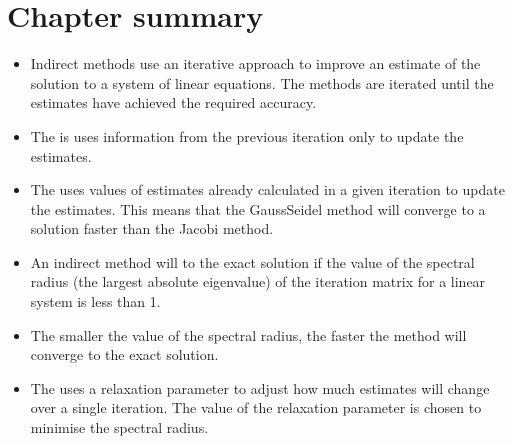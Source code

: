 \documentclass[letterpaper,10pt,english]{jupyterBook}
\begin{document}
\section{Chapter summary}
\label{\detokenize{7_Indirect_methods/7.5_Indirect_methods_summary:chapter-summary}}\label{\detokenize{7_Indirect_methods/7.5_Indirect_methods_summary::doc}}\begin{itemize}
\item {} 
\sphinxAtStartPar
Indirect methods use an iterative approach to improve an estimate of the solution to a system of linear equations. The methods are iterated until the estimates have achieved the required accuracy.

\item {} 
\sphinxAtStartPar
The {\hyperref[\detokenize{7_Indirect_methods/7.1_Jacobi_method:jacobi-method-section}]{}} is uses information from the previous iteration only to update the estimates.

\item {} 
\sphinxAtStartPar
The {\hyperref[\detokenize{7_Indirect_methods/7.2_Gauss_Seidel_method:gauss-seidel-method-section}]{}} uses values of estimates already calculated in a given iteration to update the estimates. This means that the Gauss\sphinxhyphen{}Seidel method will converge to a solution faster than the Jacobi method.

\item {} 
\sphinxAtStartPar
An indirect method will {\hyperref[\detokenize{7_Indirect_methods/7.3_Convergence_of_indirect_methods:convergence-of-indirect-methods-section}]{}} to the exact solution if the value of the spectral radius (the largest absolute eigenvalue) of the iteration matrix for a linear system is less than 1.

\item {} 
\sphinxAtStartPar
The smaller the value of the spectral radius, the faster the method will converge to the exact solution.

\item {} 
\sphinxAtStartPar
The {\hyperref[\detokenize{7_Indirect_methods/7.4_SOR_method:sor-method-section}]{}} uses a relaxation parameter to adjust how much estimates will change over a single iteration. The value of the relaxation parameter is chosen to minimise the spectral radius.

\end{itemize}
\end{document}
